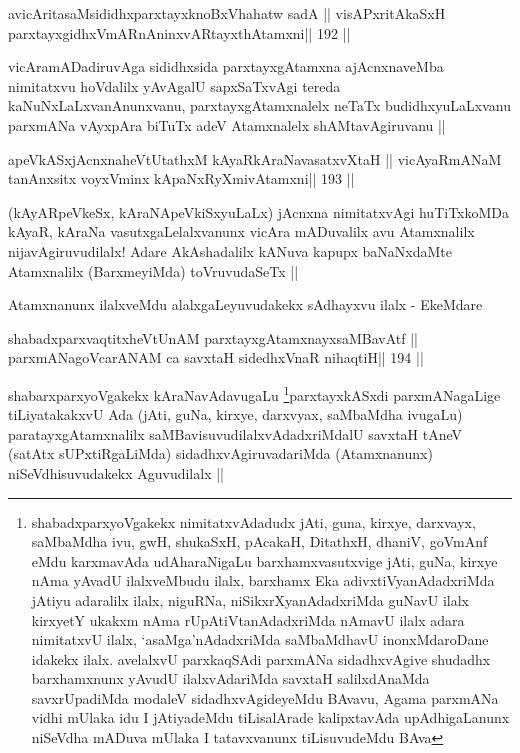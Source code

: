 \begin{shl}
avicAritasaMsididhxparxtayxknoBxVhahatw sadA ||
visAPxritAkaSxH parxtayxgidhxVmARnAninxvARtayxthA\s\s tamxni\hfill || 192 ||
\end{shl}

\begin{artha}
vicAramADadiruvAga sididhxsida parxtayxgAtamxna ajAcnxnaveMba
nimitatxvu hoVdalilx yAvAgalU sapxSaTxvAgi tereda
kaNuNxLaLxvanAnunxvanu, parxtayxgAtamxnalelx neTaTx budidhxyuLaLxvanu
parxmANa vAyxpAra biTuTx adeV Atamxnalelx shAMtavAgiruvanu ||
\end{artha}

\begin{shl}
apeVkASxjAcnxnaheVtUtathxM kAyaRkAraNavasatxvXtaH ||
vicAyaRmANaM tanAnxsitx voyxVminx kApaNxRyXmivA\s\s tamxni\hfill || 193 ||
\end{shl}

\begin{artha}
(kAyARpeVkeSx, kAraNApeVkiSxyuLaLx) jAcnxna nimitatxvAgi huTiTxkoMDa
  kAyaR, kAraNa vasutxgaLelalxvanunx vicAra mADuvalilx avu Atamxnalilx
  nijavAgiruvudilalx! Adare AkAshadalilx  kANuva kapupx baNaNxdaMte
  Atamxnalilx (BarxmeyiMda) toVruvudaSeTx ||

Atamxnanunx ilalxveMdu alalxgaLeyuvudakekx sAdhayxvu ilalx - EkeMdare
\end{artha}

\begin{shl}
shabadxparxvaqtitxheVtUnAM parxtayxgAtamxnayxsaMBavAtf ||
parxmANagoVcarANAM ca savxtaH sidedhxVnaR nihaqtiH\hfill || 194 ||
\end{shl}

\begin{artha}
shabarxparxyoVgakekx
kAraNavAdavugaLu \footnote[1]{shabadxparxyoVgakekx nimitatxvAdadudx
  jAti, guna, kirxye, darxvayx, saMbaMdha ivu, gwH, shukaSxH, pAcakaH,
DitathxH, dhaniV, goVmAnf eMdu karxmavAda udAharaNigaLu
barxhamxvasutxvige jAti, guNa, kirxye nAma yAvadU ilalxveMbudu ilalx,
barxhamx Eka adivxtiVyanAdadxriMda jAtiyu adaralilx ilalx, niguRNa,
niSikxrXyanAdadxriMda guNavU ilalx kirxyetY ukakxm nAma
rUpAtiVtanAdadxriMda nAmavU ilalx adara nimitatxvU ilalx,
`asaMga'nAdadxriMda saMbaMdhavU inonxMdaroDane idakekx
ilalx. avelalxvU parxkaqSAdi parxmANa sidadhxvAgive shudadhx
barxhamxnunx yAvudU ilalxvAdariMda savxtaH salilxdAnaMda savxrUpadiMda
modaleV sidadhxvAgideyeMdu BAvavu, Agama parxmANa vidhi mUlaka idu I
jAtiyadeMdu tiLisalArade kalipxtavAda upAdhigaLanunx niSeVdha mADuva
mUlaka I tatavxvanunx tiLisuvudeMdu BAva}parxtayxkASxdi
parxmANagaLige tiLiyatakakxvU Ada (jAti, guNa, kirxye, darxvyax,
saMbaMdha ivugaLu) paratayxgAtamxnalilx saMBavisuvudilalxvAdadxriMdalU
savxtaH tAneV (satAtx sUPxtiRgaLiMda) sidadhxvAgiruvadariMda
(Atamxnanunx) niSeVdhisuvudakekx Aguvudilalx ||
\end{artha}

